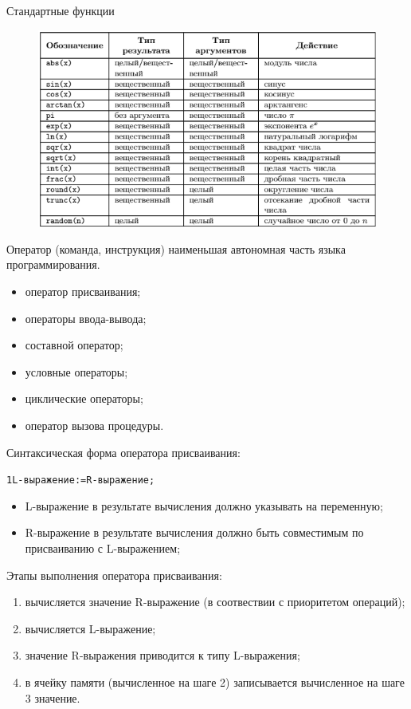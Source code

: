 \documentclass{beamer}
\begin{document}
\begin{frame}{Стандартные функции}
\begin{figure}[h]
\centering
\includegraphics[scale=0.75]{images/lec02-pic13.png}
\end{figure}
\end{frame} 

\begin{frame}
\begin{block}{Оператор (команда, инструкция)}
наименьшая автономная часть языка программирования.
\end{block}
\begin{itemize}
\item оператор присваивания;
\item операторы ввода-вывода;
\item составной оператор;
\item условные операторы;
\item циклические операторы;
\item оператор вызова процедуры.
\end{itemize}
\end{frame}

\begin{frame}[fragile]
Синтаксическая форма оператора присваивания:
\begin{alltt}
1  L-выражение := R-выражение;
\end{alltt}
\begin{itemize}
\item L-выражение в результате вычисления должно указывать на переменную;
\item R-выражение в результате вычисления должно быть совместимым по присваиванию с L-выражением;
\end{itemize}
Этапы выполнения оператора присваивания:
\begin{enumerate}
\item вычисляется значение R-выражение (в соотвествии с приоритетом операций);
\item вычисляется L-выражение;
\item значение R-выражения приводится к типу L-выражения;
\item в ячейку памяти (вычисленное на шаге 2) записывается вычисленное на шаге 3 значение.
\end{enumerate}
\end{frame}
\end{document}
